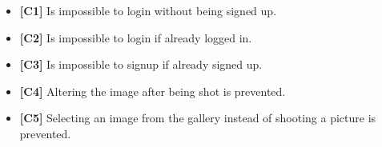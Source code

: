 \begin{itemize}
		\item \textbf{[\hypertarget{C1}{C1}]} Is impossible to login without being signed up. 
		\item \textbf{[\hypertarget{C2}{C2}]} Is impossible to login if already logged in. 
		\item \textbf{[\hypertarget{C3}{C3}]} Is impossible to signup if already signed up.
		\item \textbf{[\hypertarget{C4}{C4}]} Altering the image after being shot is prevented. 
		\item \textbf{[\hypertarget{C5}{C5}]} Selecting an image from the gallery instead of shooting a picture is prevented.
	\end{itemize}
